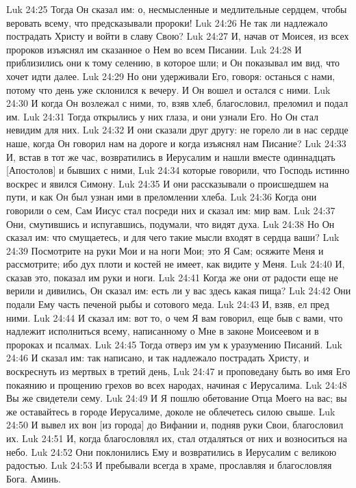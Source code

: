 Luk 24:25  Тогда Он сказал им: о, несмысленные и медлительные сердцем, чтобы веровать всему, что предсказывали пророки!
Luk 24:26  Не так ли надлежало пострадать Христу и войти в славу Свою?
Luk 24:27  И, начав от Моисея, из всех пророков изъяснял им сказанное о Нем во всем Писании.
Luk 24:28  И приблизились они к тому селению, в которое шли; и Он показывал им вид, что хочет идти далее.
Luk 24:29  Но они удерживали Его, говоря: останься с нами, потому что день уже склонился к вечеру. И Он вошел и остался с ними.
Luk 24:30  И когда Он возлежал с ними, то, взяв хлеб, благословил, преломил и подал им.
Luk 24:31  Тогда открылись у них глаза, и они узнали Его. Но Он стал невидим для них.
Luk 24:32  И они сказали друг другу: не горело ли в нас сердце наше, когда Он говорил нам на дороге и когда изъяснял нам Писание?
Luk 24:33  И, встав в тот же час, возвратились в Иерусалим и нашли вместе одиннадцать [Апостолов] и бывших с ними,
Luk 24:34  которые говорили, что Господь истинно воскрес и явился Симону.
Luk 24:35  И они рассказывали о происшедшем на пути, и как Он был узнан ими в преломлении хлеба.
Luk 24:36  Когда они говорили о сем, Сам Иисус стал посреди них и сказал им: мир вам.
Luk 24:37  Они, смутившись и испугавшись, подумали, что видят духа.
Luk 24:38  Но Он сказал им: что смущаетесь, и для чего такие мысли входят в сердца ваши?
Luk 24:39  Посмотрите на руки Мои и на ноги Мои; это Я Сам; осяжите Меня и рассмотрите; ибо дух плоти и костей не имеет, как видите у Меня.
Luk 24:40  И, сказав это, показал им руки и ноги.
Luk 24:41  Когда же они от радости еще не верили и дивились, Он сказал им: есть ли у вас здесь какая пища?
Luk 24:42  Они подали Ему часть печеной рыбы и сотового меда.
Luk 24:43  И, взяв, ел пред ними.
Luk 24:44  И сказал им: вот то, о чем Я вам говорил, еще быв с вами, что надлежит исполниться всему, написанному о Мне в законе Моисеевом и в пророках и псалмах.
Luk 24:45  Тогда отверз им ум к уразумению Писаний.
Luk 24:46  И сказал им: так написано, и так надлежало пострадать Христу, и воскреснуть из мертвых в третий день,
Luk 24:47  и проповедану быть во имя Его покаянию и прощению грехов во всех народах, начиная с Иерусалима.
Luk 24:48  Вы же свидетели сему.
Luk 24:49  И Я пошлю обетование Отца Моего на вас; вы же оставайтесь в городе Иерусалиме, доколе не облечетесь силою свыше.
Luk 24:50  И вывел их вон [из города] до Вифании и, подняв руки Свои, благословил их.
Luk 24:51  И, когда благословлял их, стал отдаляться от них и возноситься на небо.
Luk 24:52  Они поклонились Ему и возвратились в Иерусалим с великою радостью.
Luk 24:53  И пребывали всегда в храме, прославляя и благословляя Бога. Аминь.


